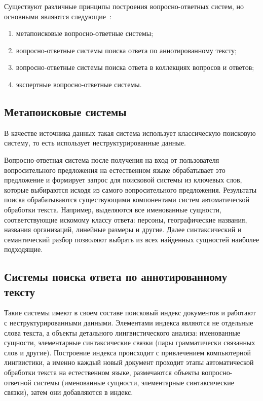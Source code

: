 Существуют различные принципы построения вопросно-ответных систем, но основными являются следующие~\cite{class1}: 
\begin{enumerate}
	\item метапоисковые вопросно-ответные системы;
	\item вопросно-ответные системы поиска ответа по аннотированному тексту;
	\item вопросно-ответные системы поиска ответа в коллекциях вопросов и ответов;
	\item экспертные вопросно-ответные системы.
\end{enumerate}

\subsection{Метапоисковые системы}

В качестве источника данных такая система использует классическую поисковую систему, то есть использует неструктурированные данные.

Вопросно-ответная система после получения на вход от пользователя вопросительного предложения на естественном языке обрабатывает это предложение и формирует запрос для поисковой системы из ключевых слов, которые выбираются исходя из самого вопросительного предложения. Результаты поиска обрабатываются существующими компонентами систем автоматической обработки текста. Например, выделяются все именованные сущности, соответствующие искомому классу ответа: персоны, географические названия, названия организаций, линейные размеры и другие. Далее синтаксический и семантический разбор позволяют выбрать из всех найденных сущностей наиболее подходящие.

\subsection{Системы поиска ответа по аннотированному тексту}

Такие системы имеют в своем составе поисковый индекс документов и работают с неструктурированными данными. Элементами индекса являются не отдельные слова текста, а объекты детального лингвистического анализа: именованные сущности, элементарные синтаксические связки (пары грамматически связанных слов и другие). Построение индекса происходит с привлечением компьютерной лингвистики, а именно каждый новый документ проходит этапы автоматической обработки текста на естественном языке, размечаются объекты вопросно-ответной системы (именованные сущности, элементарные синтаксические связки), затем они добавляются в индекс.   


